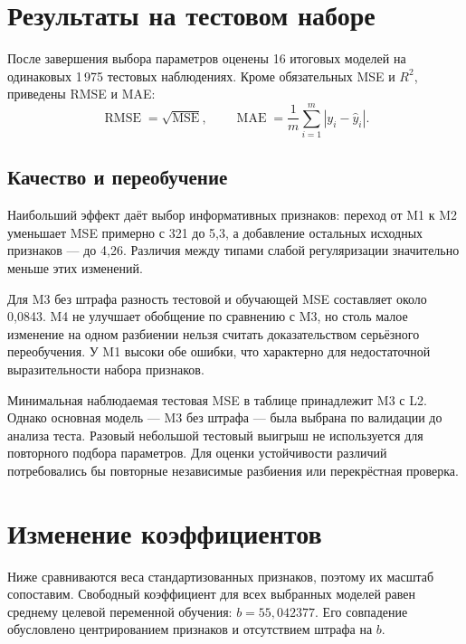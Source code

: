 \clearpage
\section{Результаты на тестовом наборе}
После завершения выбора параметров оценены 16 итоговых моделей на одинаковых 1\,975 тестовых наблюдениях. Кроме обязательных MSE и $R^2$, приведены RMSE и MAE:
\[
\operatorname{RMSE}=\sqrt{\operatorname{MSE}},\qquad
\operatorname{MAE}=\frac{1}{m}\sum_{i=1}^{m}|y_i-\hat y_i|.
\]
\begin{table}[H]\centering\small
\caption{Общая таблица тестовых метрик}

\end{table}

\subsection{Качество и переобучение}
Наибольший эффект даёт выбор информативных признаков: переход от M1 к M2 уменьшает MSE примерно с 321 до 5{,}3, а добавление остальных исходных признаков --- до 4{,}26. Различия между типами слабой регуляризации значительно меньше этих изменений.

Для M3 без штрафа разность тестовой и обучающей MSE составляет около 0{,}0843. M4 не улучшает обобщение по сравнению с M3, но столь малое изменение на одном разбиении нельзя считать доказательством серьёзного переобучения. У M1 высоки обе ошибки, что характерно для недостаточной выразительности набора признаков.

Минимальная наблюдаемая тестовая MSE в таблице принадлежит M3 с L2. Однако основная модель --- M3 без штрафа --- была выбрана по валидации до анализа теста. Разовый небольшой тестовый выигрыш не используется для повторного подбора параметров. Для оценки устойчивости различий потребовались бы повторные независимые разбиения или перекрёстная проверка.

\clearpage
\section{Изменение коэффициентов}
Ниже сравниваются веса стандартизованных признаков, поэтому их масштаб сопоставим. Свободный коэффициент для всех выбранных моделей равен среднему целевой переменной обучения: $b=55{,}042377$. Его совпадение обусловлено центрированием признаков и отсутствием штрафа на $b$.

\begin{table}[H]\centering\small
\caption{Стандартизованные коэффициенты M3}

\end{table}
\begin{table}[H]\centering\small
\caption{Стандартизованные коэффициенты M4}

\end{table}

